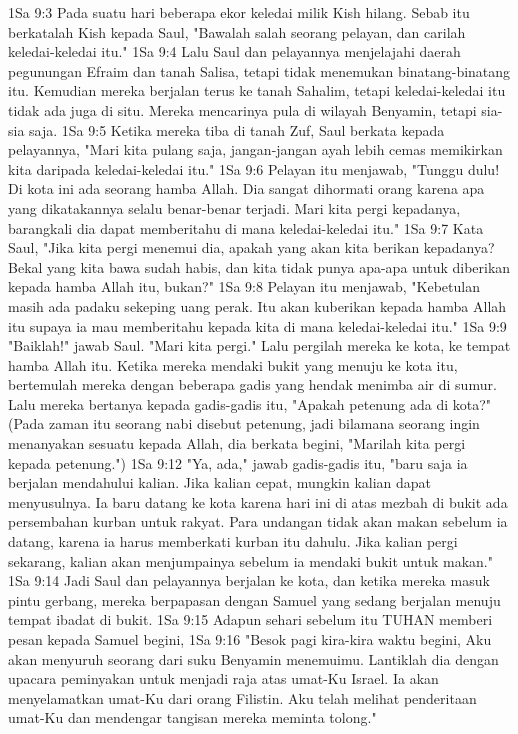 1Sa 9:3  Pada suatu hari beberapa ekor keledai milik Kish hilang. Sebab itu berkatalah Kish kepada Saul, "Bawalah salah seorang pelayan, dan carilah keledai-keledai itu."
1Sa 9:4  Lalu Saul dan pelayannya menjelajahi daerah pegunungan Efraim dan tanah Salisa, tetapi tidak menemukan binatang-binatang itu. Kemudian mereka berjalan terus ke tanah Sahalim, tetapi keledai-keledai itu tidak ada juga di situ. Mereka mencarinya pula di wilayah Benyamin, tetapi sia-sia saja.
1Sa 9:5  Ketika mereka tiba di tanah Zuf, Saul berkata kepada pelayannya, "Mari kita pulang saja, jangan-jangan ayah lebih cemas memikirkan kita daripada keledai-keledai itu."
1Sa 9:6  Pelayan itu menjawab, "Tunggu dulu! Di kota ini ada seorang hamba Allah. Dia sangat dihormati orang karena apa yang dikatakannya selalu benar-benar terjadi. Mari kita pergi kepadanya, barangkali dia dapat memberitahu di mana keledai-keledai itu."
1Sa 9:7  Kata Saul, "Jika kita pergi menemui dia, apakah yang akan kita berikan kepadanya? Bekal yang kita bawa sudah habis, dan kita tidak punya apa-apa untuk diberikan kepada hamba Allah itu, bukan?"
1Sa 9:8  Pelayan itu menjawab, "Kebetulan masih ada padaku sekeping uang perak. Itu akan kuberikan kepada hamba Allah itu supaya ia mau memberitahu kepada kita di mana keledai-keledai itu."
1Sa 9:9  "Baiklah!" jawab Saul. "Mari kita pergi." Lalu pergilah mereka ke kota, ke tempat hamba Allah itu. Ketika mereka mendaki bukit yang menuju ke kota itu, bertemulah mereka dengan beberapa gadis yang hendak menimba air di sumur. Lalu mereka bertanya kepada gadis-gadis itu, "Apakah petenung ada di kota?" (Pada zaman itu seorang nabi disebut petenung, jadi bilamana seorang ingin menanyakan sesuatu kepada Allah, dia berkata begini, "Marilah kita pergi kepada petenung.")
1Sa 9:12  "Ya, ada," jawab gadis-gadis itu, "baru saja ia berjalan mendahului kalian. Jika kalian cepat, mungkin kalian dapat menyusulnya. Ia baru datang ke kota karena hari ini di atas mezbah di bukit ada persembahan kurban untuk rakyat. Para undangan tidak akan makan sebelum ia datang, karena ia harus memberkati kurban itu dahulu. Jika kalian pergi sekarang, kalian akan menjumpainya sebelum ia mendaki bukit untuk makan."
1Sa 9:14  Jadi Saul dan pelayannya berjalan ke kota, dan ketika mereka masuk pintu gerbang, mereka berpapasan dengan Samuel yang sedang berjalan menuju tempat ibadat di bukit.
1Sa 9:15  Adapun sehari sebelum itu TUHAN memberi pesan kepada Samuel begini,
1Sa 9:16  "Besok pagi kira-kira waktu begini, Aku akan menyuruh seorang dari suku Benyamin menemuimu. Lantiklah dia dengan upacara peminyakan untuk menjadi raja atas umat-Ku Israel. Ia akan menyelamatkan umat-Ku dari orang Filistin. Aku telah melihat penderitaan umat-Ku dan mendengar tangisan mereka meminta tolong."
